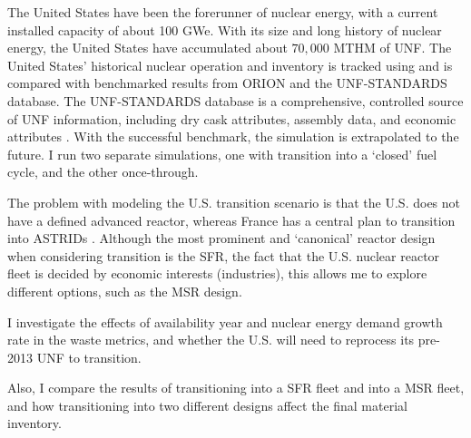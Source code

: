 The United States have been the forerunner of nuclear energy, with a current
installed capacity of about 100 GWe. With its size and long history of nuclear
energy, the United States have accumulated about $70,000$ \gls{MTHM} of \gls{UNF}.
The United States' historical nuclear operation and inventory is tracked using
\Cyclus and is compared with benchmarked results from \gls{ORION} and the
\gls{UNF-STANDARDS} database. The \gls{UNF-STANDARDS} database is a comprehensive,
controlled source of \gls{UNF} information, including dry cask attributes, assembly
data, and economic attributes \cite{peterson_unf-st&dards_2017}. With the successful benchmark,
the simulation is extrapolated to the future. I run two separate simulations, 
one with transition into a `closed' fuel cycle, and the other once-through.

The problem with modeling the U.S. transition scenario is that the U.S. does not have
a defined advanced reactor, whereas France has a central plan to transition into \glspl{ASTRID} \cite{boullis_french_2015, varaine_pre-conceptual_2012}.
Although the most prominent and `canonical' reactor design when considering
transition is the \gls{SFR}, the fact that the U.S. nuclear reactor fleet
is decided by economic interests (industries), this allows me to explore
different options, such as the \gls{MSR} design.

I investigate the effects of availability year and nuclear energy
demand growth rate in the waste metrics, and whether the U.S. will
need to reprocess its pre-2013 \gls{UNF} to transition.

Also, I compare the results of transitioning into a \gls{SFR} fleet
and into a \gls{MSR} fleet, and how transitioning into two different designs
affect the final material inventory.

